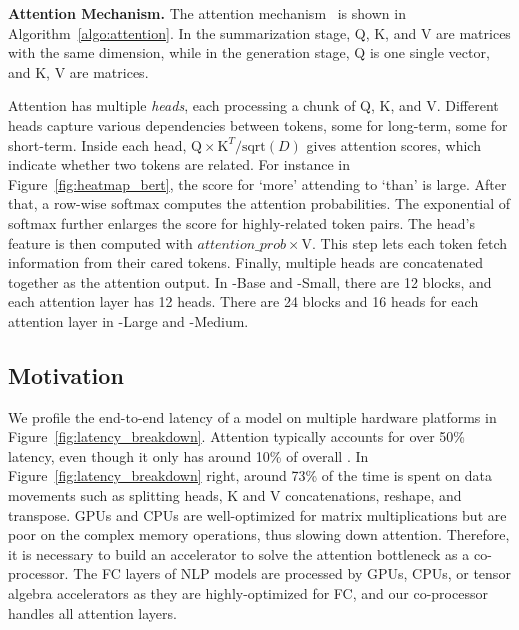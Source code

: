 




\textbf{Attention Mechanism.} The attention mechanism~\cite{46201} is shown in Algorithm~\ref{algo:attention}. In the summarization stage, Q, K, and V are matrices with the same dimension, while in the generation stage, Q is one single vector, and K, V are matrices. 

Attention has multiple \textit{heads}, each processing a chunk of Q, K, and V. Different heads capture various dependencies between tokens, some for long-term, some for short-term. Inside each head, $\mathrm{Q} \times \mathrm{K}^{T} / \mathrm{sqrt}(D)$ gives attention scores, which indicate whether two tokens are related. For instance in Figure~\ref{fig:heatmap_bert}, the score for `more' attending to `than' is large. After that, a row-wise softmax computes the attention probabilities. The exponential of softmax further enlarges the score for highly-related token pairs. The head's feature is then computed with $attention\_prob \times$V. This step lets each token fetch information from their cared tokens. Finally, multiple heads are concatenated together as the attention output. In \bert-Base and \gpttwo-Small, there are 12 blocks, and each attention layer has 12 heads. There are 24 blocks and 16 heads for each attention layer in \bert-Large and \gpttwo-Medium.



\subsection{Motivation}
\label{sec:motivation}
We profile the end-to-end latency of a \gpttwo model on multiple hardware platforms in Figure~\ref{fig:latency_breakdown}. Attention typically accounts for over 50\% latency, even though it only has around 10\% of overall \flops. In Figure~\ref{fig:latency_breakdown} right, around 73\% of the time is spent on data movements such as splitting heads, K and V concatenations, reshape, and transpose. 
GPUs and CPUs are well-optimized for matrix multiplications but are poor on the complex memory operations, thus slowing down attention. Therefore, it is necessary to build an accelerator to solve the attention bottleneck as a co-processor. The FC layers of NLP models are processed by GPUs, CPUs, or tensor algebra accelerators as they are highly-optimized for FC, and our \name co-processor handles all attention layers.




